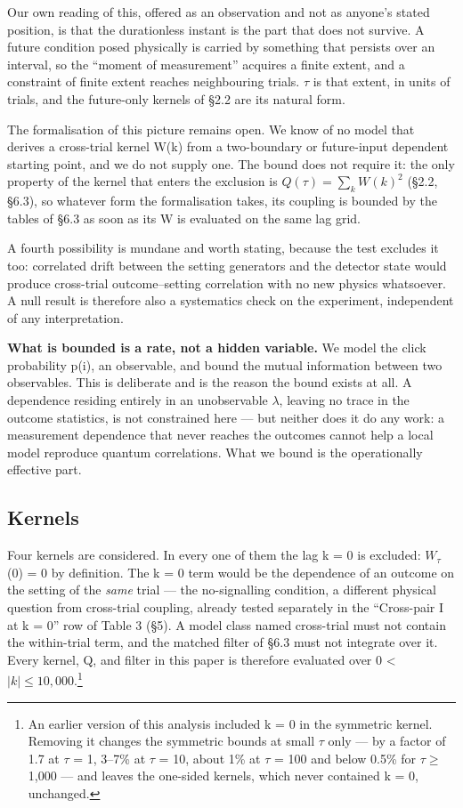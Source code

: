 \documentclass[
  11pt,
]{article}
\begin{document}
\begin{enumerate}
  Our own reading of this, offered as an observation and not as anyone's
  stated position, is that the durationless instant is the part that
  does not survive. A future condition posed physically is carried by
  something that persists over an interval, so the ``moment of
  measurement'' acquires a finite extent, and a constraint of finite
  extent reaches neighbouring trials. \(\tau\) is that extent, in units
  of trials, and the future-only kernels of \S2.2 are its natural form.

  The formalisation of this picture remains open. We know of no model
  that derives a cross-trial kernel W(k) from a two-boundary or
  future-input dependent starting point, and we do not supply one. The
  bound does not require it: the only property of the kernel that enters
  the exclusion is \(Q(\tau)=\sum_k W(k)^2\) (\S2.2, \S6.3), so whatever
  form the formalisation takes, its coupling is bounded by the tables of
  \S6.3 as soon as its W is evaluated on the same lag grid.
\end{enumerate}

A fourth possibility is mundane and worth stating, because the test
excludes it too: correlated drift between the setting generators and the
detector state would produce cross-trial outcome--setting correlation
with no new physics whatsoever. A null result is therefore also a
systematics check on the experiment, independent of any interpretation.

\textbf{What is bounded is a rate, not a hidden variable.} We model the
click probability p(i), an observable, and bound the mutual information
between two observables. This is deliberate and is the reason the bound
exists at all. A dependence residing entirely in an unobservable
\(\lambda\), leaving no trace in the outcome statistics, is not
constrained here --- but neither does it do any work: a measurement
dependence that never reaches the outcomes cannot help a local model
reproduce quantum correlations. What we bound is the operationally
effective part.

\subsection{Kernels}

Four kernels are considered. In every one of them the lag k = 0 is
excluded: \(W_{\tau}\)(0) = 0 by definition. The k = 0 term would be the
dependence of an outcome on the setting of the \emph{same} trial --- the
no-signalling condition, a different physical question from cross-trial
coupling, already tested separately in the ``Cross-pair I at k = 0'' row
of Table 3 (\S5). A model class named cross-trial must not contain the
within-trial term, and the matched filter of \S6.3 must not integrate
over it. Every kernel, Q, and filter in this paper is therefore
evaluated over 0 \textless{} \(|k| \le 10{,}000\).\footnote{An earlier
  version of this analysis included k = 0 in the symmetric kernel.
  Removing it changes the symmetric bounds at small \(\tau\) only --- by
  a factor of 1.7 at \(\tau\) = 1, 3--7\% at \(\tau\) = 10, about 1\% at
  \(\tau\) = 100 and below 0.5\% for \(\tau \ge\) 1,000 --- and leaves
  the one-sided kernels, which never contained k = 0, unchanged.}
\end{document}
